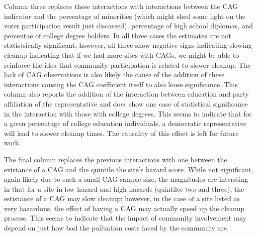 \documentclass[12pt]{article}
\begin{document}
{Column three replaces these interactions with interactions between the CAG indicator and the percentage of minorities (which might shed some light on the voter participation result just discussed), percentage of high school diplomas, and percentae of college degree holders. In all three cases the estimates are not statistsically significant; however, all three show negative signs indicating slowing cleanup indicating that if we had more sites with CAGs, we might be able to reinforce the idea that community participation is related to slower cleanup. The lack of CAG observations is also likely the cause of the addition of these interactions causing the CAG coefficient itself to also loose significance. This column also reports the addition of the interaction between education and party affiliation of the representative and does show one case of statistical significance in the interaction with those with college degrees. This seems to indicate that for a given percentage of college education individuals, a democratic representative will lead to slower cleanup times. The causality of this effect is left for future work. 

The final column replaces the previous interactions with one between the existance of a CAG and the quintile the site's hazard score. While not significant, again likely due to such a small CAG sample size, the magnitudes are intersting in that for a site in low hazard and high hazards (quintiles two and three), the estistance of a CAG may slow cleanup; however, in the case of a site listed as very hazardous, the effect of having a CAG may actually speed up the cleanup process. This seems to indicate that the impact of community involvement may depend on just how bad the polluation costs faced by the community are. 












}
\end{document}
